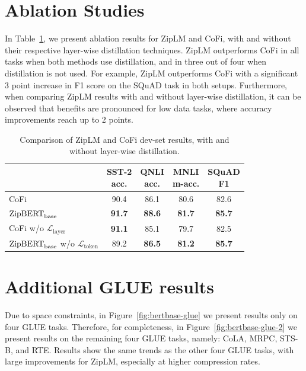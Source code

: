 \documentclass{article}
\newcommand{\ourmethod}{ZipLM}
\newcommand{\ourmethodbase}{$\textrm{ZipBERT}_{\small{\textrm{base}}}$}
\newcommand{\comment}[1]{}
\theoremstyle{plain}
\theoremstyle{definition}
\theoremstyle{remark}
\begin{document}
\section{Ablation Studies}
\label{app:distil}
In Table~\ref{tab:ablation-token-distill}, we present ablation results for \ourmethod{} and CoFi, with and without their respective layer-wise distillation techniques. \ourmethod{} outperforms CoFi in all tasks when both methods use distillation, and in three out of four when distillation is not used. For example, \ourmethod{} outperforms CoFi with a significant 3 point increase in F1 score on the SQuAD task in both setups. Furthermore, when comparing \ourmethod{} results with and without layer-wise distillation, it can be observed that benefits are pronounced for low data tasks, where accuracy improvements reach up to 2 points.
\begin{table}[!h]
\setlength\tabcolsep{5pt}
    \caption{Comparison of \ourmethod{} and CoFi dev-set results, with and without layer-wise distillation.}
    \comment{Speedups: SST2 - (CoFi vs ZipLM = 11.3x vs 11.8x), QNLI - (CoFi vs ZipLM = 10.9x vs 10.9x), MNLI - (CoFi vs ZipLM = 11.4x vs 11.8x), SQuAD - (CoFi vs ZipLM = 8x vs 8.2x)}
    \label{tab:ablation-token-distill}
    \centering
    \small{
        \begin{tabular}{lcccc}
        \toprule
        & \makecell{SST-2\\acc.} & \makecell{QNLI\\acc.} & \makecell{MNLI\\m-acc.} & \makecell{SQuAD\\F1} \\
        \midrule
        CoFi & 90.4 & 86.1 & 80.6 & 82.6 \\ 
        \ourmethodbase{} & \textbf{91.7} & \textbf{88.6} & \textbf{81.7} & \textbf{85.7} \\ 
        \midrule
        CoFi w/o $\mathcal{L}_{\mathrm{layer}}$  & \textbf{91.1} & 85.1 & 79.7 & 82.5 \\
        \ourmethodbase{} w/o $\mathcal{L}_{\mathrm{token}}$ & 89.2 & \textbf{86.5} & \textbf{81.2} & \textbf{85.7} \\
        \bottomrule
        \end{tabular}
    }
\end{table}

\section{Additional GLUE results}
Due to space constraints, in Figure~\ref{fig:bertbase-glue} we present results only on four GLUE tasks. Therefore, for completeness, in Figure~\ref{fig:bertbase-glue-2} we present results on the remaining four GLUE tasks, namely: CoLA, MRPC, STS-B, and RTE. Results show the same trends as the other four GLUE tasks, with large improvements for ZipLM, especially at higher compression rates.
\end{document}
